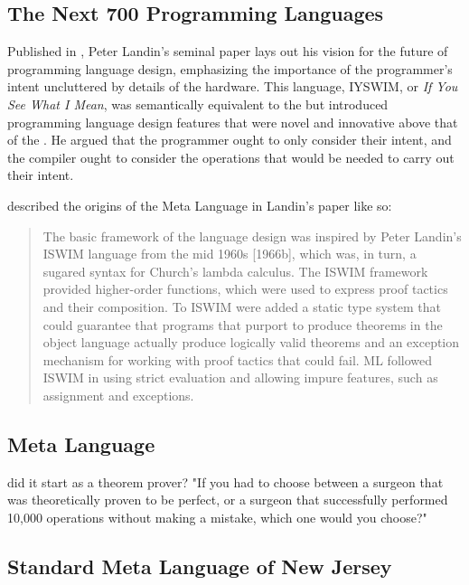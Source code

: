 \subsection{The Next 700 Programming Languages}

Published in \citeyear{landin_next_700_prog_langs_1966},
Peter Landin's seminal paper  lays out his vision for
the future of programming language design, emphasizing the importance of the programmer's intent
uncluttered by details of the hardware.
This language, IYSWIM, or \textit{If You See What I Mean}, was semantically
equivalent to the \lambdacalc but introduced programming language design features
that were novel and innovative above that of the \lambdacalc.
He argued that the programmer ought to only consider their intent, and the compiler ought to
consider the operations that would be needed to carry out their intent.

\citeauthor{hopl_history_of_ml_2020} described the origins of the Meta Language in Landin's paper
like so\cite{hopl_history_of_ml_2020}:

\begin{quotation}
	The basic framework of the language design was inspired by Peter Landin’s ISWIM language
	from the mid 1960s [1966b], which was, in turn, a sugared syntax for Church’s lambda calculus. The
	ISWIM framework provided higher-order functions, which were used to express proof tactics and
	their composition. To ISWIM were added a static type system that could guarantee that programs
	that purport to produce theorems in the object language actually produce logically valid theorems
	and an exception mechanism for working with proof tactics that could fail. ML followed ISWIM in
	using strict evaluation and allowing impure features, such as assignment and exceptions.
\end{quotation}

\subsection{Meta Language}

did it start as a theorem prover?
"If you had to choose between a surgeon that was theoretically proven to
be perfect, or a surgeon that successfully performed 10,000 operations without
making a mistake, which one would you choose?"

\subsection{Standard Meta Language of New Jersey}

